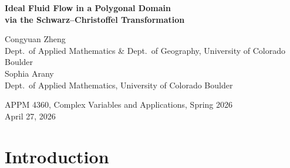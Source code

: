 \documentclass[11pt]{article}
\newcommand{\HH}{\mathbb{H}}
\begin{document}
\begin{titlepage}
  \centering
  \vspace*{3.5cm}
  {\LARGE\bfseries Ideal Fluid Flow in a Polygonal Domain\\[0.6em]
   via the Schwarz--Christoffel Transformation\par}
  \vspace{2.5cm}
  {\large
    Congyuan Zheng\\
    \small Dept.\ of Applied Mathematics \& Dept.\ of Geography,
    University of Colorado Boulder\\[1em]
    \large Sophia Arany\\
    \small Dept.\ of Applied Mathematics,
    University of Colorado Boulder\par}
  \vspace{2.5cm}
  {\normalsize APPM 4360, Complex Variables and Applications,
   Spring 2026\\[0.4em]
   April 27, 2026\par}
\end{titlepage}

\begin{abstract}
This paper applies the Schwarz--Christoffel (SC) conformal mapping to simulate
steady, irrotational, incompressible ideal fluid flow inside a 12-vertex
simplification of the Boulder County, Colorado boundary polygon. The SC
transformation maps the upper half-plane $\HH$ conformally onto the polygonal
domain $\Omega$, converting analytically tractable complex potentials in $\HH$
into streamline and equipotential patterns in the physical domain. Two flow
models are derived and implemented: a uniform ideal flow $W = U\zeta$
providing the baseline conformal grid, and a doubly-connected flow in which a
downtown obstacle is modelled via the Milne-Thomson circle theorem. The SC
parameter problem is solved by softmax pre-vertex parameterisation combined
with Levenberg--Marquardt least squares on side-length ratios computed by
Gauss--Legendre quadrature. All results are produced through the forward SC
map, yielding streamlines that satisfy the no-penetration boundary condition
exactly by construction. A closed-form verification on the rectangle-to-half-plane
map confirms the implementation.
\end{abstract}

\newpage

\section{Introduction}
\end{document}

